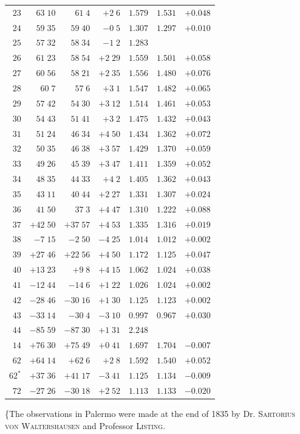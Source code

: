 \begin{center}
\begin{tabular}{r||r|r|r||r|r|r}
$23$&$63\;10$&$61\;4$&$+2\;6$&$1.579$&$1.531$&$+0.048$\\
$24$&$59\;35$&$59\;40$&$-0\;5$&$1.307$&$1.297$&$+0.010$\\
$25$&$57\;32$&$58\;34$&$-1\;2$&$1.283$&&\\
$26$&$61\;23$&$58\;54$&$+2\;29$&$1.559$&$1.501$&$+0.058$\\
$27$&$60\;56$&$58\;21$&$+2\;35$&$1.556$&$1.480$&$+0.076$\\
$28$&$60\;7$&$57\;6$&$+3\;1$&$1.547$&$1.482$&$+0.065$\\
$29$&$57\;42$&$54\;30$&$+3\;12$&$1.514$&$1.461$&$+0.053$\\
$30$&$54\;43$&$51\;41$&$+3\;2$&$1.475$&$1.432$&$+0.043$\\[2pt]
$31$&$51\;24$&$46\;34$&$+4\;50$&$1.434$&$1.362$&$+0.072$\\
$32$&$50\;35$&$46\;38$&$+3\;57$&$1.429$&$1.370$&$+0.059$\\
$33$&$49\;26$&$45\;39$&$+3\;47$&$1.411$&$1.359$&$+0.052$\\
$34$&$48\;35$&$44\;33$&$+4\;2$&$1.405$&$1.362$&$+0.043$\\
$35$&$43\;11$&$40\;44$&$+2\;27$&$1.331$&$1.307$&$+0.024$\\
$36$&$41\;50$&$37\;3$&$+4\;47$&$1.310$&$1.222$&$+0.088$\\
$37$&$+42\;50$&$+37\;57$&$+4\;53$&$1.335$&$1.316$&$+0.019$\\
$38$&$-7\;15$&$-2\;50$&$-4\;25$&$1.014$&$1.012$&$+0.002$\\
$39$&$+27\;46$&$+22\;56$&$+4\;50$&$1.172$&$1.125$&$+0.047$\\
$40$&$+13\;23$&$+9\;8$&$+4\;15$&$1.062$&$1.024$&$+0.038$\\[2pt]
$41$&$-12\;44$&$-14\;6$&$+1\;22$&$1.026$&$1.024$&$+0.002$\\
$42$&$-28\;46$&$-30\;16$&$+1\;30$&$1.125$&$1.123$&$+0.002$\\
$43$&$-33\;14$&$-30\;4$&$-3\;10$&$0.997$&$0.967$&$+0.030$\\
$44$&$-85\;59$&$-87\;30$&$+1\;31$&$2.248$&&\\
$14$&$+76\;30$&$+75\;49$&$+0\;41$&$1.697$&$1.704$&$-0.007$\\
$62$&$+64\;14$&$+62\;6$&$+2\;8$&$1.592$&$1.540$&$+0.052$\\
$62^{*}$&$+37\;36$&$+41\;17$&$-3\;41$&$1.125$&$1.134$&$-0.009$\\
$72$&$-27\;26$&$-30\;18$&$+2\;52$&$1.113$&$1.133$&$-0.020$\\
\hline
\end{tabular}
\end{center}
\endgroup
\clearpage
{}
\{The observations in Palermo were made at the end of 1835 by Dr. \textsc{Sartorius von Waltershausen} and Professor \textsc{Listing}.

